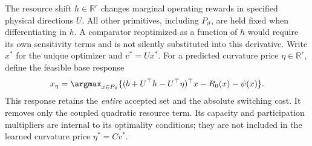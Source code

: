 The resource shift $h\in\mathbb R^r$ changes marginal operating rewards in specified physical directions $U$. All other primitives, including $P_\vartheta$, are held fixed when differentiating in $h$. A comparator reoptimized as a function of $h$ would require its own sensitivity terms and is not silently substituted into this derivative. Write $x^*$ for the unique optimizer and $v^*=Ux^*$. For a predicted curvature price $\eta\in\mathbb R^r$, define the feasible base response
\begin{equation}\label{eq:r15-response}
 x_\eta=\argmax_{x\in P_\vartheta}
 \{(b+U^\top h-U^\top\eta)^\top x-R_0(x)-\psi(x)\}.
\end{equation}
This response retains the \emph{entire} accepted set and the absolute switching cost. It removes only the coupled quadratic resource term. Its capacity and participation multipliers are internal to its optimality conditions; they are not included in the learned curvature price $\eta^*=Cv^*$.


